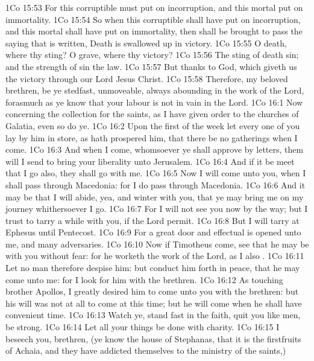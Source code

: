 \vs 1Co 15:53 For this corruptible must put on incorruption, and this mortal  put on immortality.
\vs 1Co 15:54 So when this corruptible shall have put on incorruption, and this mortal shall have put on immortality, then shall be brought to pass the saying that is written, Death is swallowed up in victory.
\vs 1Co 15:55 O death, where  thy sting? O grave, where  thy victory?
\vs 1Co 15:56 The sting of death  sin; and the strength of sin  the law.
\vs 1Co 15:57 But thanks  to God, which giveth us the victory through our Lord Jesus Christ.
\vs 1Co 15:58 Therefore, my beloved brethren, be ye stedfast, unmoveable, always abounding in the work of the Lord, forasmuch as ye know that your labour is not in vain in the Lord.
\vs 1Co 16:1 Now concerning the collection for the saints, as I have given order to the churches of Galatia, even so do ye.
\vs 1Co 16:2 Upon the first  of the week let every one of you lay by him in store, as  hath prospered him, that there be no gatherings when I come.
\vs 1Co 16:3 And when I come, whomsoever ye shall approve by  letters, them will I send to bring your liberality unto Jerusalem.
\vs 1Co 16:4 And if it be meet that I go also, they shall go with me.
\vs 1Co 16:5 Now I will come unto you, when I shall pass through Macedonia: for I do pass through Macedonia.
\vs 1Co 16:6 And it may be that I will abide, yea, and winter with you, that ye may bring me on my journey whithersoever I go.
\vs 1Co 16:7 For I will not see you now by the way; but I trust to tarry a while with you, if the Lord permit.
\vs 1Co 16:8 But I will tarry at Ephesus until Pentecost.
\vs 1Co 16:9 For a great door and effectual is opened unto me, and  many adversaries.
\vs 1Co 16:10 Now if Timotheus come, see that he may be with you without fear: for he worketh the work of the Lord, as I also .
\vs 1Co 16:11 Let no man therefore despise him: but conduct him forth in peace, that he may come unto me: for I look for him with the brethren.
\vs 1Co 16:12 As touching  brother Apollos, I greatly desired him to come unto you with the brethren: but his will was not at all to come at this time; but he will come when he shall have convenient time.
\vs 1Co 16:13 Watch ye, stand fast in the faith, quit you like men, be strong.
\vs 1Co 16:14 Let all your things be done with charity.
\vs 1Co 16:15 I beseech you, brethren, (ye know the house of Stephanas, that it is the firstfruits of Achaia, and  they have addicted themselves to the ministry of the saints,)
